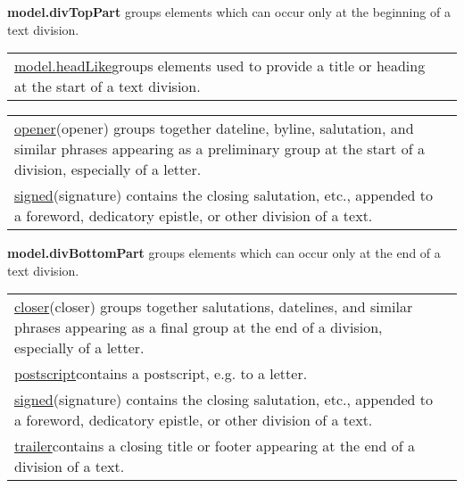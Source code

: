\begin{sansreflist}
\item [\textbf{model.divTopPart}] groups elements which can occur only at the beginning of a text division. \par 
\begin{longtable}{P{0.298828125\textwidth}P{0.551171875\textwidth}}
\hyperref[TEI.model.headLike]{model.headLike}\tabcellsep groups elements used to provide a title or heading at the start of a text division.\end{longtable} \par
  \par 
\begin{longtable}{P{0.145\textwidth}P{0.7050000000000001\textwidth}}
\hyperref[TEI.opener]{opener}\tabcellsep (opener) groups together dateline, byline, salutation, and similar phrases appearing as a preliminary group at the start of a division, especially of a letter.\\
\hyperref[TEI.signed]{signed}\tabcellsep (signature) contains the closing salutation, etc., appended to a foreword, dedicatory epistle, or other division of a text.\end{longtable} \par
 
\item [\textbf{model.divBottomPart}] groups elements which can occur only at the end of a text division. \par 
\begin{longtable}{P{0.2083657587548638\textwidth}P{0.6416342412451361\textwidth}}
\hyperref[TEI.closer]{closer}\tabcellsep (closer) groups together salutations, datelines, and similar phrases appearing as a final group at the end of a division, especially of a letter.\\
\hyperref[TEI.postscript]{postscript}\tabcellsep contains a postscript, e.g. to a letter.\\
\hyperref[TEI.signed]{signed}\tabcellsep (signature) contains the closing salutation, etc., appended to a foreword, dedicatory epistle, or other division of a text.\\
\hyperref[TEI.trailer]{trailer}\tabcellsep contains a closing title or footer appearing at the end of a division of a text.\end{longtable} \par
 

\end{sansreflist}

